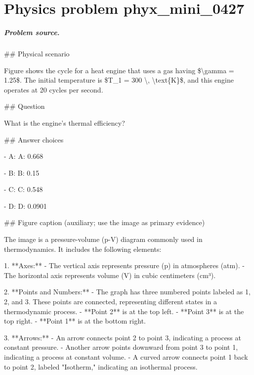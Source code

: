 
\chapter{Physics problem phyx\_mini\_0427}
\label{ch:PhyXMiniProblems_problem_phyx_mini_0427}

\paragraph{Problem source.}
\#\# Physical scenario

Figure shows the cycle for a heat engine that uses a gas having \$\textbackslash{}gamma = 1.25\$. The initial temperature is \$T\_1 = 300 \textbackslash{}, \textbackslash{}text\{K\}\$, and this engine operates at 20 cycles per second.

\#\# Question

What is the engine's thermal efficiency?

\#\# Answer choices

- A: A: 0.668

- B: B: 0.15

- C: C: 0.548

- D: D: 0.0901

\#\# Figure caption (auxiliary; use the image as primary evidence)

The image is a pressure-volume (p-V) diagram commonly used in thermodynamics. It includes the following elements:

1. **Axes:**
   - The vertical axis represents pressure (p) in atmospheres (atm).
   - The horizontal axis represents volume (V) in cubic centimeters (cm³).

2. **Points and Numbers:** 
   - The graph has three numbered points labeled as 1, 2, and 3. These points are connected, representing different states in a thermodynamic process.
   - **Point 2** is at the top left.
   - **Point 3** is at the top right.
   - **Point 1** is at the bottom right.

3. **Arrows:**
   - An arrow connects point 2 to point 3, indicating a process at constant pressure.
   - Another arrow points downward from point 3 to point 1, indicating a process at constant volume.
   - A curved arrow connects point 1 back to point 2, labeled "Isotherm," indicating an isothermal process.

